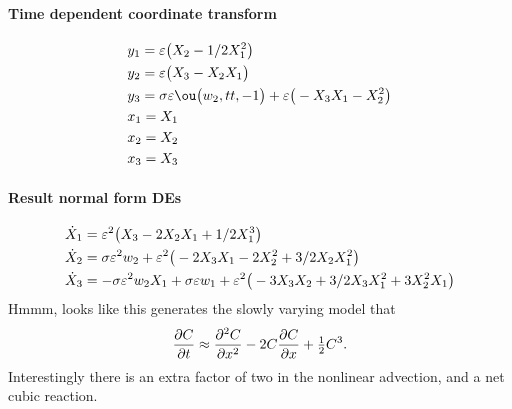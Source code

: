 \paragraph{Time dependent coordinate transform}
\begin{align*}&
y_{1}=\eps \big(X_{2}-1/2 X_{1}^{2}
\big)%
\\&
y_{2}=\eps \big(X_{3}-X_{2} X_{1}
\big)%
\\&
y_{3}=\sigma  \eps \ou\big(w_{2},tt,-1\big)+\eps \big(-X_{3} X_{1}-X_{2}
^{2}
\big)%
\\&
x_{1}=%
X_{1}
\\&
x_{2}=%
X_{2}
\\&
x_{3}=%
X_{3}
\end{align*}

\paragraph{Result normal form DEs}
\begin{align*}&
\dot X_{1}=\varepsilon^{2} \big(X_{3}-2 X_{2} X_{1}+1/2 X_{1}^{3}\big)
\\&
\dot X_{2}=\sigma  \varepsilon^{2} w_{2}+\varepsilon^{2} \big(-2 X_{3} X_{1}-2 X_{2}^{
2}+3/2 X_{2} X_{1}^{2}\big)
\\&
\dot X_{3}=-\sigma  \varepsilon^{2} w_{2} X_{1}+\sigma  \varepsilon w_{1}+\varepsilon^{2} 
\big(-3 X_{3} X_{2}+3/2 X_{3} X_{1}^{2}+3 X_{2}^{2} X_{1}\big)
\end{align*}
Hmmm, looks like this generates the slowly varying model that
\begin{equation*}
\D tC\approx \DD xC-2C\D xC+\rat12C^3.
\end{equation*}
Interestingly there is an extra factor of two in the nonlinear advection, and a net cubic reaction.


